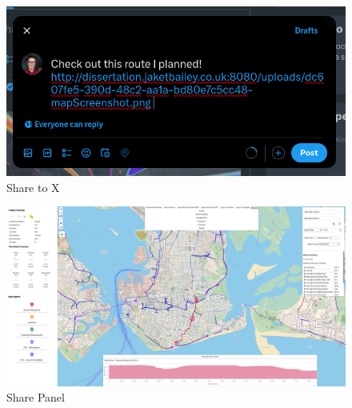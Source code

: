 \begin{figure}[!ht]
    \centering
    \includegraphics[width=425px]{figures/Progress Images/Iteration-3/SR51/SR51-Share to X.png}
    \caption{Share to X}
    \label{fig:share-x}
\end{figure}

\begin{figure}[!ht]
    \centering
    \includegraphics[width=425px]{figures/Progress Images/Iteration-3/SR51/SR51-Updated Share Panel.png}
    \caption{Share Panel}
    \label{fig:share-panel}
\end{figure}